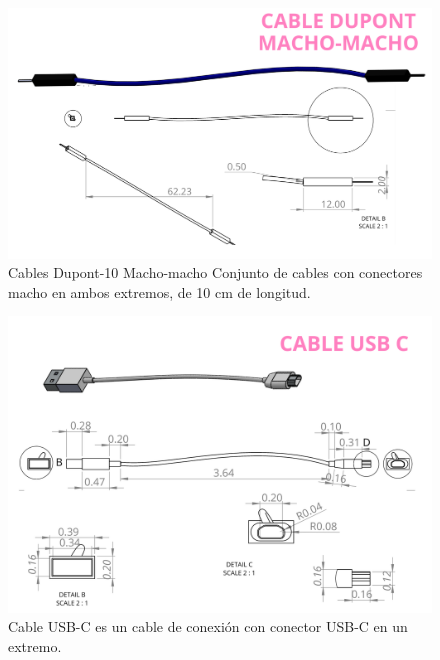     \begin{figure}[H]
        \centering
        \includegraphics[scale=0.3]{34/img/dupontMachoMacho.png}
        \caption{Cables Dupont-10 Macho-macho Conjunto de cables con conectores macho en ambos extremos, de 10 cm de longitud.}
        \label{fig:resistencia}
    \end{figure}
    
    \begin{figure}[H]
        \centering
        \includegraphics[scale=0.3]{34/img/cableUsbC.png}
        \caption{Cable USB-C es un cable de conexión con conector USB-C en un extremo.}
        \label{fig:cableUsbC}
    \end{figure}
    
